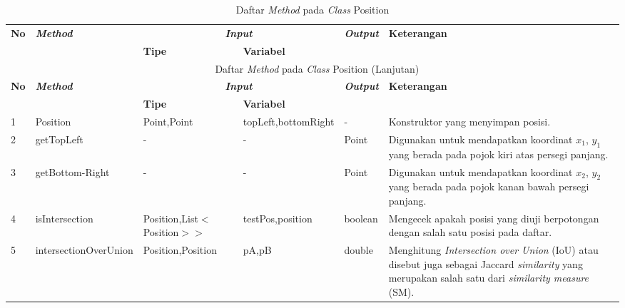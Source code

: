 \begin{small}
\begin{longtable}{|p{0.4cm}|p{2cm}|p{1.8cm}|p{1.8cm}|p{1.7cm}|p{3.55cm}|}
	\caption{Daftar \textit{Method} pada \textit{Class} Position \label{tbl:classPosition}}\\
	\hline
	\multirow{2}{*}{\textbf{No}} & \multirow{2}{*}{\textit{\textbf{Method}}} & \multicolumn{2}{c|}{\textit{\textbf{Input}}} & \multirow{2}{*}{\textit{\textbf{Output}}} & 
	\multirow{2}{*}{\textbf{Keterangan}}\\
	\cline{3-4}
	& & \textbf{Tipe} & \textbf{Variabel} & & \\
	\endfirsthead
	\multicolumn{6}{c}{\textbf{\tablename~\thetable} Daftar \textit{Method} pada \textit{Class} Position (Lanjutan)} \\
	\hline
	\multirow{2}{*}{\textbf{No}} & \multirow{2}{*}{\textit{\textbf{Method}}} & \multicolumn{2}{c|}{\textit{\textbf{Input}}} & \multirow{2}{*}{\textit{\textbf{Output}}} & 
	\multirow{2}{*}{\textbf{Keterangan}}\\
	\cline{3-4}
	& & \textbf{Tipe} & \textbf{Variabel} & & \\
	\endhead
	\hline
	1 & Position & Point,\newline Point & topLeft,\newline bottomRight & - & Konstruktor yang menyimpan posisi.\\
	\hline
	2 & getTopLeft & - & - & Point & Digunakan untuk mendapatkan koordinat $x_{1}$, $y_{1}$ yang berada pada pojok kiri atas persegi panjang.\\
	\hline
	3 & getBottom-\newline Right & - & - & Point & Digunakan untuk mendapatkan koordinat $x_{2}$, $y_{2}$ yang berada pada pojok kanan bawah persegi panjang.\\
	\hline
	4 & isIntersection & Position,\newline List$<$\newline Position$>$$>$ & testPos,\newline position & boolean & Mengecek apakah posisi yang diuji berpotongan dengan salah satu posisi pada daftar.\\
	\hline
	5 & intersection\newline OverUnion & Position,\newline Position & pA,\newline pB & double & Menghitung \textit{Intersection over Union} (IoU) atau disebut juga sebagai Jaccard \textit{similarity} yang merupakan salah satu dari \textit{similarity measure} (SM).\\
	\hline
\end{longtable}
\end{small}
\endgroup

